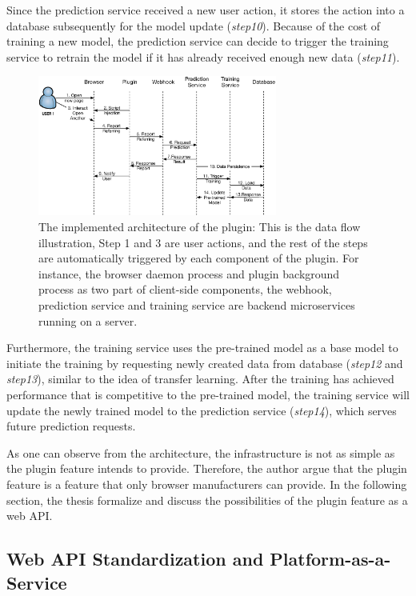 Since the prediction service received a new user action, it stores the action into a database
subsequently for the model update (\emph{step10}). Because of the cost of training a new model,
the prediction service can decide to trigger the training service to retrain the model 
if it has already received enough new data (\emph{step11}).

\begin{figure}[H]
    \centering
    \includegraphics[width=0.7\textwidth]{figures/arch}
    \caption{The implemented architecture of the plugin: This is the data flow illustration,
    Step 1 and 3 are user actions, and the rest of the steps are automatically triggered by
    each component of the plugin. For instance, the browser daemon process
    and plugin background process as two part of client-side components, the webhook,
    prediction service and training service are backend microservices running on a server.}
    \label{fig:arch}
\end{figure}

Furthermore, the training service uses the pre-trained model as
a base model to initiate the training by requesting newly created data from database (\emph{step12} and \emph{step13}), 
similar to the idea of transfer learning.
After the training has achieved performance that is competitive to the pre-trained model,
the training service will update the newly trained model to the prediction service (\emph{step14}), which 
serves future prediction requests.

As one can observe from the architecture, the infrastructure is not as simple as 
the plugin feature intends to provide. Therefore, the author argue that the plugin feature is a feature that
only browser manufacturers can provide. In the following section, the thesis formalize and discuss 
the possibilities of the plugin feature as a web API.

\subsection{Web API Standardization and Platform-as-a-Service}

